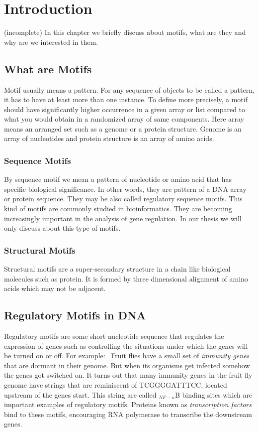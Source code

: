 \chapter{Introduction}\label{intro}
(incomplete)
In this chapter we briefly discuss about motifs,
what are they and why are we interested in them. 


\section{What are Motifs}
Motif usually means a pattern. For any sequence
of objects to be called a pattern, it has to have at least
more than one instance. To define more precisely, a motif
should have significantly higher occurrence in a given array
or list compared to what you would obtain in a randomized
array of same components. Here array means an arranged set
such as a genome or a protein structure. Genome is an array
of nucleotides and protein structure is an array of amino acids.



\subsection{Sequence Motifs}
By sequence motif we mean a pattern
of nucleotide or amino acid that has specific biological
significance. In other words, they are pattern of a DNA array or
protein sequence. They may be also called regulatory sequence
motifs. This kind of motifs are commonly studied in bioinformatics.
They are becoming increasingly important in the analysis of gene
regulation. In our thesis we will only discuss about this type of motifs.


\subsection{Structural Motifs}
Structural motifs are a super-secondary
structure in a chain like biological molecules such as protein.
It is formed by three dimensional alignment of amino acids
which may not be adjacent. 


\section{Regulatory Motifs in DNA}
Regulatory motifs are some short nucleotide
sequence that regulates the expression of genes such as controlling
the situations under which the genes will be turned on or off.
For example:~\cite{jones2004introduction} Fruit flies have a small
set of \textit{immunity genes} that are dormant
in their genome. But when its organisms get infected somehow the genes
got switched on. It turns out that many immunity genes in
the fruit fly genome have strings that are reminiscent of TCGGGGATTTCC,
located upstream of the genes start. This string are called $ _{NF-\kappa}$B
binding sites which are important examples of regulatory motifs. Proteins
known as \textit{transcription factors} bind to these motifs, encouraging
RNA polymerase to transcribe the downstream genes.


